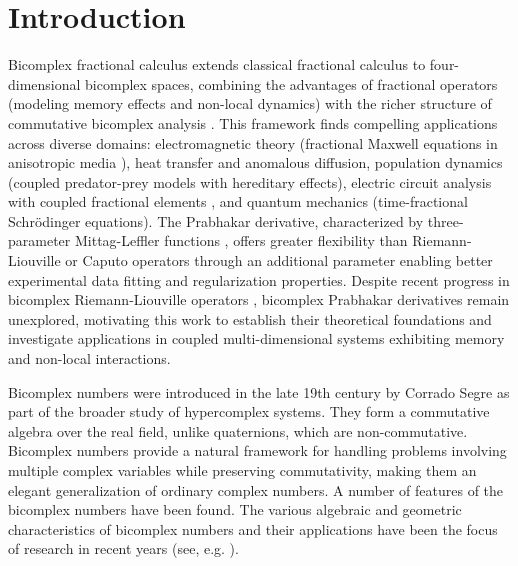 \documentclass[a4paper,12pt]{article}
\theoremstyle{remark}
\begin{document}
\section{Introduction}
Bicomplex fractional calculus extends classical fractional calculus \cite{kilbas2006} to four-dimensional bicomplex spaces, combining the advantages of fractional operators (modeling memory effects and non-local dynamics) with the richer structure of commutative bicomplex analysis \cite{price1991}. This framework finds compelling applications across diverse domains: electromagnetic theory (fractional Maxwell equations in anisotropic media \cite{kumar2023generalization}), heat transfer and anomalous diffusion, population dynamics (coupled predator-prey models with hereditary effects), electric circuit analysis with coupled fractional elements \cite{thirumalai2025perception}, and quantum mechanics (time-fractional Schrödinger equations). The Prabhakar derivative, characterized by three-parameter Mittag-Leffler functions \cite{prabhakar1971singular}, offers greater flexibility than Riemann-Liouville or Caputo operators through an additional parameter enabling better experimental data fitting and regularization properties. Despite recent progress in bicomplex Riemann-Liouville operators \cite{goswami2022riemann}, bicomplex Prabhakar derivatives remain unexplored, motivating this work to establish their theoretical foundations and investigate applications in coupled multi-dimensional systems exhibiting memory and non-local interactions.



Bicomplex numbers were introduced in the late 19th century by Corrado Segre \cite{csegre1892} as part of the broader study of hypercomplex systems. They form a commutative algebra over the real field, unlike quaternions, which are non-commutative. Bicomplex numbers provide a natural framework for handling problems involving multiple complex variables while preserving commutativity, making them an elegant generalization of ordinary complex numbers. A number of features of the bicomplex numbers have been found.  The various algebraic and geometric characteristics of bicomplex numbers and their applications have been the focus of research in recent years (see,  e.g. \cite{  rochon2004b, ronn2001, meluna2012}).

	
\end{document}
